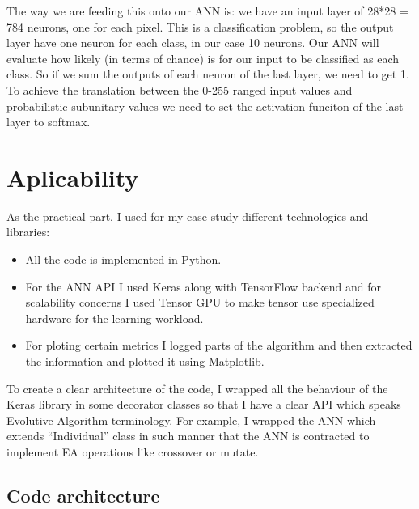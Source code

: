 \documentclass[11pt]{article}
\providecommand{\tightlist}{%
      \setlength{\itemsep}{0pt}\setlength{\parskip}{0pt}}
\begin{document}
The way we are feeding this onto our ANN is: we have an input layer of
28*28 = 784 neurons, one for each pixel. This is a classification
problem, so the output layer have one neuron for each class, in our case
10 neurons. Our ANN will evaluate how likely (in terms of chance) is for
our input to be classified as each class. So if we sum the outputs of
each neuron of the last layer, we need to get 1. To achieve the
translation between the 0-255 ranged input values and probabilistic
subunitary values we need to set the activation funciton of the last
layer to softmax.

    \hypertarget{aplicability}{%
\section{Aplicability}\label{aplicability}}

As the practical part, I used for my case study different technologies
and libraries:

\begin{itemize}
\tightlist
\item
  All the code is implemented in Python.
\item
  For the ANN API I used Keras along with TensorFlow backend and for
  scalability concerns I used Tensor GPU to make tensor use specialized
  hardware for the learning workload.
\item
  For ploting certain metrics I logged parts of the algorithm and then
  extracted the information and plotted it using Matplotlib.
\end{itemize}

To create a clear architecture of the code, I wrapped all the behaviour
of the Keras library in some decorator classes so that I have a clear
API which speaks Evolutive Algorithm terminology. For example, I wrapped
the ANN which extends ``Individual'' class in such manner that the ANN
is contracted to implement EA operations like crossover or mutate.

\hypertarget{code-architecture}{%
\subsection{Code architecture}\label{code-architecture}}
\end{document}
